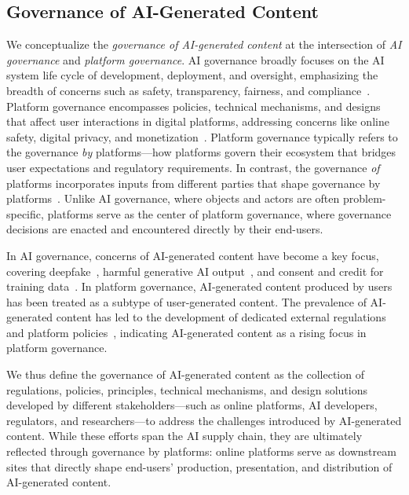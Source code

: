\subsection{Governance of AI-Generated Content}
\label{subsec:govAIGC}
We conceptualize the \textit{governance of AI-generated content} at the intersection of \textit{AI governance} and \textit{platform governance}. AI governance broadly focuses on the AI system life cycle of development, deployment, and oversight, emphasizing the breadth of concerns such as safety, transparency, fairness, and compliance~\cite{taeihagh2021governance, butcher2019state}. Platform governance encompasses policies, technical mechanisms, and designs that affect user interactions in digital platforms, addressing concerns like online safety, digital privacy, and monetization~\cite{gorwa2019platform}. Platform governance typically refers to the governance \textit{by} platforms---how platforms govern their ecosystem that bridges user expectations and regulatory requirements. In contrast, the governance \textit{of} platforms incorporates inputs from different parties that shape governance by platforms~\cite{gorwa2019platform, gillespie2017governance}. Unlike AI governance, where objects and actors are often problem-specific, platforms serve as the center of platform governance, where governance decisions are enacted and encountered directly by their end-users. 

In AI governance, concerns of AI-generated content have become a key focus, covering deepfake~\cite{geng2023comparing}, harmful generative AI output~\cite{gao2025cannot,hacker2023regulating}, and consent and credit for training data~\cite{kyi2025governance}. In platform governance, AI-generated content produced by users has been treated as a subtype of user-generated content. The prevalence of AI-generated content has led to the development of dedicated external regulations and platform policies~\cite{gao2026governance}, indicating AI-generated content as a rising focus in platform governance. 

We thus define the governance of AI-generated content as the collection of regulations, policies, principles, technical mechanisms, and design solutions developed by different stakeholders---such as online platforms, AI developers, regulators, and researchers---to address the challenges introduced by AI-generated content. While these efforts span the AI supply chain, they are ultimately reflected through governance by platforms: online platforms serve as downstream sites that directly shape end-users' production, presentation, and distribution of AI-generated content.